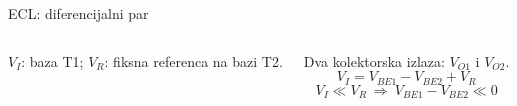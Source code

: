 \begin{frame}[label=10-s082]{ECL: diferencijalni par}
\setlength{\abovedisplayskip}{4pt}\setlength{\belowdisplayskip}{4pt}\setlength{\abovedisplayshortskip}{3pt}\setlength{\belowdisplayshortskip}{3pt}
\begin{columns}[T,onlytextwidth]\centering \raggedright
$V_I$: baza T1; $V_R$: fiksna referenca na bazi T2.\par Dva kolektorska izlaza: $V_{O1}$ i $V_{O2}$.\medskip
\[V_I=V_{BE1}-V_{BE2}+V_R\]
\[V_I\ll V_R\ \Longrightarrow\ V_{BE1}-V_{BE2}\ll0\]
\medskip{}\end{columns}
\end{frame}
